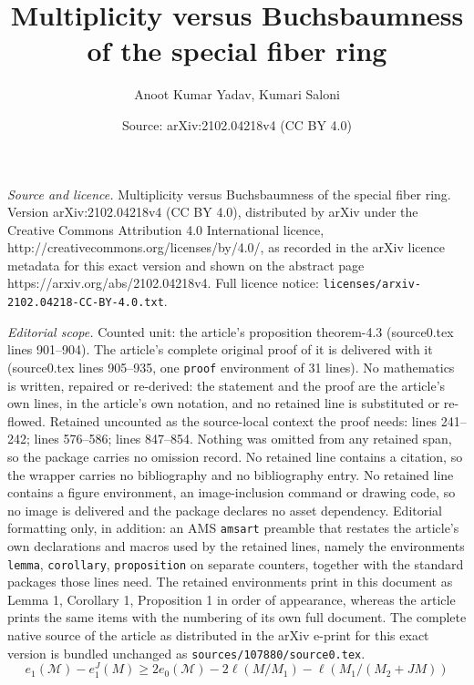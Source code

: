 \documentclass[10pt,a4paper]{amsart}
\title{Multiplicity versus Buchsbaumness of the special fiber ring}
\author{Anoot Kumar Yadav, Kumari Saloni}
\date{Source: arXiv:2102.04218v4 (CC BY 4.0)}
\def\M{{\mathcal M}}
\begin{document}
\maketitle

\noindent\emph{Source and licence.} Multiplicity versus Buchsbaumness of the special fiber ring. Version arXiv:2102.04218v4 (CC BY 4.0), distributed by arXiv under the Creative Commons Attribution 4.0 International licence, http://creativecommons.org/licenses/by/4.0/, as recorded in the arXiv licence metadata for this exact version and shown on the abstract page https://arxiv.org/abs/2102.04218v4. Full licence notice: \texttt{licenses/arxiv-2102.04218-CC-BY-4.0.txt}.\par\smallskip

\noindent\textit{Editorial scope.} Counted unit: the article's proposition theorem-4.3 (source0.tex lines 901--904). The article's complete original proof of it is delivered with it (source0.tex lines 905--935, one \texttt{proof} environment of 31 lines). No mathematics is written, repaired or re-derived: the statement and the proof are the article's own lines, in the article's own notation, and no retained line is substituted or re-flowed.  Retained uncounted as the source-local context the proof needs: lines 241--242; lines 576--586; lines 847--854.  Nothing was omitted from any retained span, so the package carries no omission record.  No retained line contains a citation, so the wrapper carries no bibliography and no bibliography entry.  No retained line contains a figure environment, an image-inclusion command or drawing code, so no image is delivered and the package declares no asset dependency.  Editorial formatting only, in addition: an AMS \texttt{amsart} preamble that restates the article's own declarations and macros used by the retained lines, namely the environments \texttt{lemma}, \texttt{corollary}, \texttt{proposition} on separate counters, together with the standard packages those lines need.  The retained environments print in this document as Lemma 1, Corollary 1, Proposition 1 in order of appearance, whereas the article prints the same items with the numbering of its own full document.  The complete native source of the article as distributed in the arXiv e-print for this exact version is bundled unchanged as \texttt{sources/107880/source0.tex}.
	 \begin{equation}\label{very-1st-eqn(a)}
	 	e_1(\M)-e_1^J(M)\geq 2e_0(\M)-2\ell(M/M_1)-\ell(M_1/(M_2+JM)) \end{equation}
\end{document}

